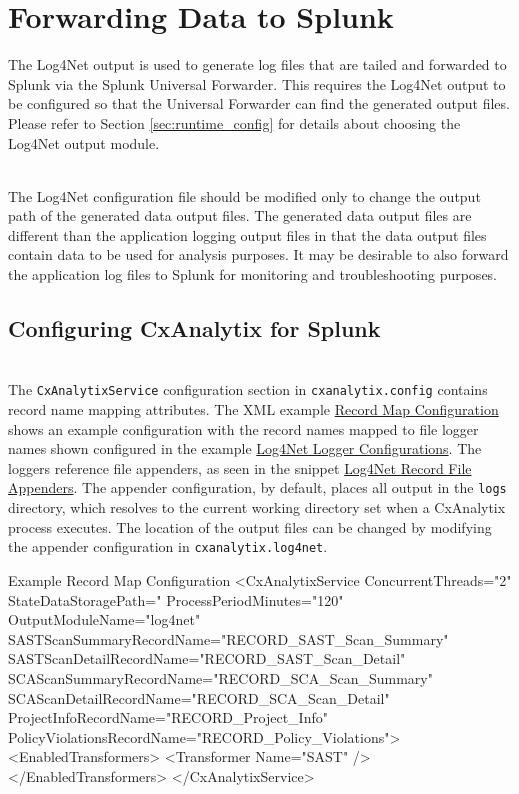 \chapter{Forwarding Data to Splunk}\label{chap:splunk_config}

The Log4Net output is used to generate log files that are tailed and forwarded to Splunk via the Splunk Universal Forwarder.  This requires the Log4Net
output to be configured so that the Universal Forwarder can find the generated output files.  Please refer to Section \ref{sec:runtime_config} for details
about choosing the Log4Net output module.

\noindent\\The Log4Net configuration file should be modified only to change the output path of the generated data output files.  The generated data output files are different
than the application logging output files in that the data output files contain data to be used for analysis purposes. It may be desirable to also forward
the application log files to Splunk for monitoring and troubleshooting purposes.


\section{Configuring CxAnalytix for Splunk}\label{sec:splunk}

\noindent\\The \texttt{CxAnalytixService} configuration section in \texttt{cxanalytix.config} contains record name mapping attributes.  The XML example 
\hyperref[lst:record_map]{Record Map Configuration}
shows an example configuration with the record names mapped to file logger names shown configured in the example 
\hyperref[lst:record_loggers]{Log4Net Logger Configurations}.  The loggers
reference file appenders, as seen in the snippet \hyperref[lst:record_appenders]{Log4Net Record File Appenders}.  The appender configuration, 
by default, places all output in the \texttt{logs}
directory, which resolves to the current working directory set when a CxAnalytix process executes.  The location of the output files can be changed
by modifying the appender configuration in \texttt{cxanalytix.log4net}.



\begin{code}{Example Record Map Configuration}{\label{lst:record_map}}{}
<CxAnalytixService 
    ConcurrentThreads="2" 
    StateDataStoragePath="%
    ProcessPeriodMinutes="120"
    OutputModuleName="log4net"
    SASTScanSummaryRecordName="RECORD_SAST_Scan_Summary"
    SASTScanDetailRecordName="RECORD_SAST_Scan_Detail"
    SCAScanSummaryRecordName="RECORD_SCA_Scan_Summary"
    SCAScanDetailRecordName="RECORD_SCA_Scan_Detail"
    ProjectInfoRecordName="RECORD_Project_Info"
    PolicyViolationsRecordName="RECORD_Policy_Violations">
    <EnabledTransformers>
        <Transformer Name="SAST" />
    </EnabledTransformers>
</CxAnalytixService>
\end{code}


